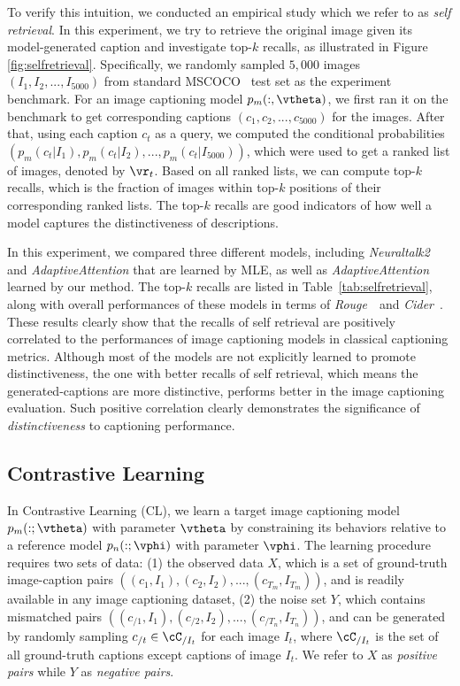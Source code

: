 To verify this intuition, we conducted an empirical study which we refer to as \emph{self retrieval}.
In this experiment, we try to retrieve the original image given its model-generated caption
and investigate top-$k$ recalls, as illustrated in Figure \ref{fig:selfretrieval}.
Specifically, we randomly sampled $5,000$ images $(I_1, I_2, ..., I_{5000})$ from standard MSCOCO \cite{lin2014microsoft}~test set
as the experiment benchmark.
For an image captioning model $p_m(:,\vtheta)$,
we first ran it on the benchmark to get corresponding captions $(c_1, c_2, ..., c_{5000})$ for the images.
After that,
using each caption $c_t$ as a query,
we computed the conditional probabilities $(p_m(c_t|I_1), p_m(c_t|I_2), ..., p_m(c_t|I_{5000}))$,
which were used to get a ranked list of images, denoted by $\vr_t$.
Based on all ranked lists, we can compute top-$k$ recalls,
which is the fraction of images within top-$k$ positions of their corresponding ranked lists.
The top-$k$ recalls are good indicators of how well a model captures
the distinctiveness of descriptions.


In this experiment, we compared three different models, including 
\emph{Neuraltalk2} \cite{karpathy2015deep} and \emph{AdaptiveAttention} \cite{lu2016knowing} that are learned by MLE,
as well as \emph{AdaptiveAttention} learned by our method.
The top-$k$ recalls are listed in Table~\ref{tab:selfretrieval},
along with overall performances of these models in terms of
\emph{Rouge}~\cite{lin2004rouge}~and \emph{Cider}~\cite{vedantam2015cider}.
These results clearly show that
the recalls of self retrieval are positively correlated to the performances of image captioning models
in classical captioning metrics.
Although most of the models are not explicitly learned to promote distinctiveness,
the one with better recalls of self retrieval,
which means the generated-captions are more distinctive,
performs better in the image captioning evaluation.
Such positive correlation clearly demonstrates the significance of
\emph{distinctiveness} to captioning performance.

\subsection{Contrastive Learning}

In Contrastive Learning (CL),
we learn a target image captioning model $p_m(:;\vtheta)$ with parameter $\vtheta$
by constraining its behaviors relative to a reference model $p_n(:;\vphi)$ with parameter $\vphi$.
%
The learning procedure requires two sets of data:
(1) the observed data $X$,
which is a set of ground-truth image-caption pairs $((c_1, I_1), (c_2, I_2), ..., (c_{T_m}, I_{T_m}))$,
and is readily available in any image captioning dataset,
(2) the noise set $Y$,
which contains mismatched pairs $((c_{/1}, I_1), (c_{/2}, I_2), ..., (c_{/T_n}, I_{T_n}))$,
and can be generated by randomly sampling $c_{/t} \in \cC_{/I_t}$ for each image $I_t$,
where $\cC_{/I_t}$ is the set of all ground-truth captions except captions of image $I_t$.
We refer to $X$ as \emph{positive pairs} while $Y$ as \emph{negative pairs}.

